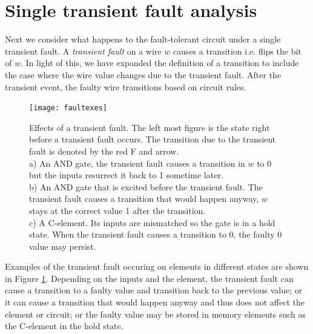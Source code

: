 \documentclass[12pt]{report}
\begin{document}
\section{Single transient fault analysis}
Next we consider what happens to the fault-tolerant circuit under a single transient fault.  A {\em transient fault} on a wire $w$ causes a transition i.e. flips the bit of $w$.  In light of this, we have expanded the definition of a transition to include the case where the wire value changes due to the transient fault.  After the transient event, the faulty wire transitions based on circuit rules.  %
\begin{figure}
  \centering
    \texttt{[image: faultexes]}
  \caption[Effects of a transient fault]{Effects of a transient fault.  The left most figure is the state right before a transient fault occurs.  The transition due to the transient fault is denoted by the red F and arrow.   \\
  a) An AND gate, the transient fault causes a transition in $w$ to 0 but the inputs resurrect it back to 1 sometime later.   \\
  b) An AND gate that is excited before the transient fault.  The transient fault causes a transition that would happen anyway, $w$ stays at the correct value 1 after the transition.\\
  c) A C-element.  Its inputs are mismatched so the gate is in a hold state.  When the transient fault causes a transition to 0, the faulty 0 value may persist.
  }
  \label{fig:faultx}
\end{figure}
Examples of the transient fault occuring on elements in different states are shown in Figure \ref{fig:faultx}.  Depending on the inputs and the element, the transient fault can cause a transition to a faulty value and transition back to the previous value; or it can cause a transition that would happen anyway and thus does not affect the element or circuit; or the faulty value may be stored in memory elements such as the C-element in the hold state.\\
\end{document}
